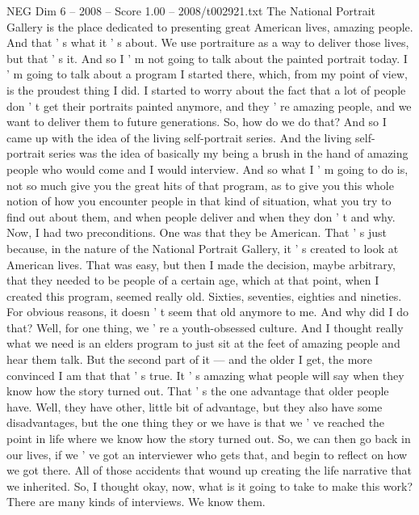 \begin{textsample}{NEG Dim 6 – 2008 – Score 1.00 – 2008/t002921.txt}  \label{ex:f6_neg_066}
The National Portrait Gallery is the place dedicated to presenting great American lives, amazing people.
And that ' s what it ' s about.
We use portraiture as a way to deliver those lives, but that ' s it.
And so I ' m not going to talk about the painted portrait today.
I ' m going to talk about a program I started there, which, from my point of view, is the proudest thing I did.
I started to worry about the fact that a lot of people don ' t get their portraits painted anymore, and they ' re amazing people, and we want to deliver them to future generations.
So, how do we do that?
And so I came up with the idea of the living self-portrait series.
And the living self-portrait series was the idea of basically my being a brush in the hand of amazing people who would come and I would interview.
And so what I ' m going to do is, not so much give you the great hits of that program, as to give you this whole notion of how you encounter people in that kind of situation, what you try to find out about them, and when people deliver and when they don ' t and why.
Now, I had two preconditions.
One was that they be American.
That ' s just because, in the nature of the National Portrait Gallery, it ' s created to look at American lives.
That was easy, but then I made the decision, maybe arbitrary, that they needed to be people of a certain age, which at that point, when I created this program, seemed really old.
Sixties, seventies, eighties and nineties.
For obvious reasons, it doesn ' t seem that old anymore to me.
And why did I do that?
Well, for one thing, we ' re a youth-obsessed culture.
And I thought really what we need is an elders program to just sit at the feet of amazing people and hear them talk.
But the second part of it — and the older I get, the more convinced I am that that ' s true.
It ' s amazing what people will say when they know how the story turned out.
That ' s the one advantage that older people have.
Well, they have other, little bit of advantage, but they also have some disadvantages, but the one thing they or we have is that we ' ve reached the point in life where we know how the story turned out.
So, we can then go back in our lives, if we ' ve got an interviewer who gets that, and begin to reflect on how we got there.
All of those accidents that wound up creating the life narrative that we inherited.
So, I thought okay, now, what is it going to take to make this work?
There are many kinds of interviews.
We know them.

\end{textsample}
